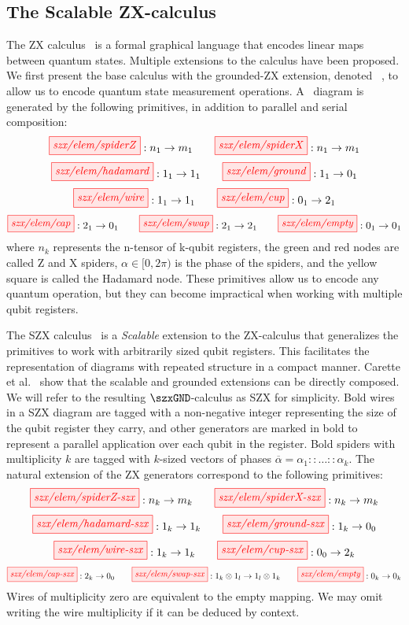 \subsection{The Scalable ZX-calculus}%
\label{sec:szx}

The ZX calculus~\cite{vdw_working_cs_zx} is a formal graphical language
that encodes linear maps between quantum states.
Multiple extensions to the calculus have been proposed.
We first present the base calculus with the grounded-ZX extension,
denoted \zxGND~\cite{ground},
to allow us to encode quantum state measurement operations.
A \zxGND\ diagram is generated by the following primitives,
in addition to parallel and serial composition:
\[
    \tikzfig{szx/elem/spiderZ} : n_1 \to m_1
    \qquad
    \tikzfig{szx/elem/spiderX} : n_1 \to m_1
\]
\[
    \tikzfig{szx/elem/hadamard} : 1_1 \to 1_1
    \qquad
    \tikzfig{szx/elem/ground} : 1_1 \to 0_1
\]
\[
    \tikzfig{szx/elem/wire} : 1_1 \to 1_1
    \qquad
    \tikzfig{szx/elem/cup} : 0_1 \to 2_1
\]
\[
    \tikzfig{szx/elem/cap} : 2_1 \to 0_1
    \qquad
    \tikzfig{szx/elem/swap} : 2_1 \to 2_1
    \qquad
    \tikzfig{szx/elem/empty} : 0_1 \to 0_1
\]
where $n_k$ represents the n-tensor of k-qubit registers,
the green and red nodes are called Z and X spiders,
$\alpha \in [0,2\pi)$ is the phase of the spiders,
and the yellow square is called the Hadamard node.
These primitives allow us to encode any quantum operation,
but they can become impractical when working with multiple qubit registers.

The SZX calculus~\cite{carette_szx-calculus_2019,carette_quantum_2021}
is a \textit{Scalable} extension to the ZX-calculus
that generalizes the primitives to work with arbitrarily sized qubit registers.
This facilitates the representation of diagrams with repeated structure
in a compact manner. 
Carette et al.~\cite{carette_quantum_2021} show that the scalable and grounded extensions
can be directly composed.
We will refer to the resulting $\szxGND$-calculus as SZX for simplicity.
%
Bold wires in a SZX diagram are tagged with a non-negative integer representing
the size of the qubit register they carry, and other generators are marked in bold 
to represent a parallel application over each qubit in the register.
Bold spiders with multiplicity $k$ are tagged with $k$-sized vectors of phases
$\overline\alpha = \alpha_1 :: \dots :: \alpha_k$.
The natural extension of the ZX generators correspond to the following primitives:
\[
    \tikzfig{szx/elem/spiderZ-szx} : n_k \to m_k
    \qquad
    \tikzfig{szx/elem/spiderX-szx} : n_k \to m_k
\]
\[
    \tikzfig{szx/elem/hadamard-szx} : 1_k \to 1_k
    \qquad
    \tikzfig{szx/elem/ground-szx} : 1_k \to 0_0
\]
\[
    \tikzfig{szx/elem/wire-szx} : 1_k \to 1_k
    \qquad
    \tikzfig{szx/elem/cup-szx} : 0_0 \to 2_k
\]
\[
    \tikzfig{szx/elem/cap-szx} : 2_k \to 0_0
    \qquad
    \tikzfig{szx/elem/swap-szx} : 1_k \otimes 1_l \to 1_l \otimes 1_k
    \qquad
    \tikzfig{szx/elem/empty} : 0_k \to 0_k
\]
Wires of multiplicity zero are equivalent to the empty mapping.
We may omit writing the wire multiplicity if it can be deduced by context. 

